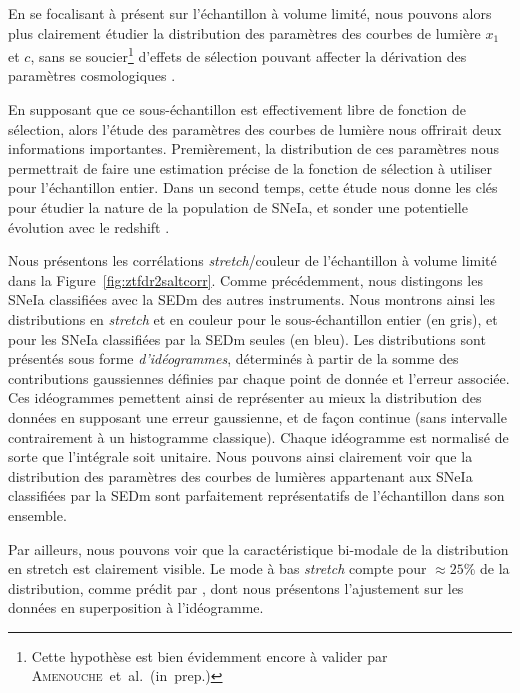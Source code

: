 \documentclass[../main/main.tex]{subfiles}
\begin{document}
En se focalisant à présent sur l'échantillon à volume limité, nous
pouvons alors plus clairement étudier la distribution des paramètres des courbes de
lumière $x_{1}$ et $c$, sans se soucier\footnote{Cette hypothèse est bien évidemment encore à
valider par \mbox{\textsc{Amenouche} et al. (in prep.)}} d'effets de sélection pouvant
affecter la dérivation des paramètres cosmologiques
\citep{Scolnicbias2016}.

En supposant que ce sous-échantillon est effectivement libre de fonction
de sélection, alors l'étude des paramètres des courbes de lumière nous
offrirait deux informations importantes. Premièrement, la distribution
de ces paramètres nous permettrait
de faire une estimation précise de la fonction de sélection à utiliser
pour l'échantillon entier. Dans un second temps, cette étude nous donne les
clés pour étudier la nature de la population de SNeIa, et sonder une potentielle
évolution avec le redshift \citep{NoraNicolas21}.



Nous présentons les corrélations \textit{stretch}/couleur de
l'échantillon à volume limité
dans la Figure~\ref{fig:ztfdr2saltcorr}. Comme précédemment, nous
distingons les SNeIa classifiées avec la SEDm des autres
instruments. Nous montrons ainsi les distributions en \textit{stretch}
et en couleur pour le sous-échantillon entier (en gris), et pour les SNeIa
classifiées par la SEDm seules (en bleu). Les distributions sont
présentés sous forme \textit{d'idéogrammes}, déterminés à partir de la
somme des contributions gaussiennes définies par chaque point de donnée
et l'erreur associée. Ces idéogrammes pemettent ainsi de représenter au
mieux la distribution des données en supposant une erreur gaussienne, et
de façon continue (sans intervalle contrairement à un histogramme
classique). Chaque idéogramme est normalisé de sorte que l'intégrale
soit unitaire. Nous pouvons ainsi clairement voir que la distribution
des paramètres des courbes de lumières appartenant aux SNeIa classifiées
par la SEDm sont parfaitement représentatifs de l'échantillon dans son ensemble. 

Par ailleurs, nous pouvons voir que la caractéristique bi-modale
de la distribution en stretch est clairement visible. Le mode à bas
\textit{stretch} compte pour $\approx25\%$ de la distribution, comme prédit par
\citet{NoraNicolas21}, dont nous présentons l'ajustement sur les données
en superposition à l'idéogramme.
\end{document}
